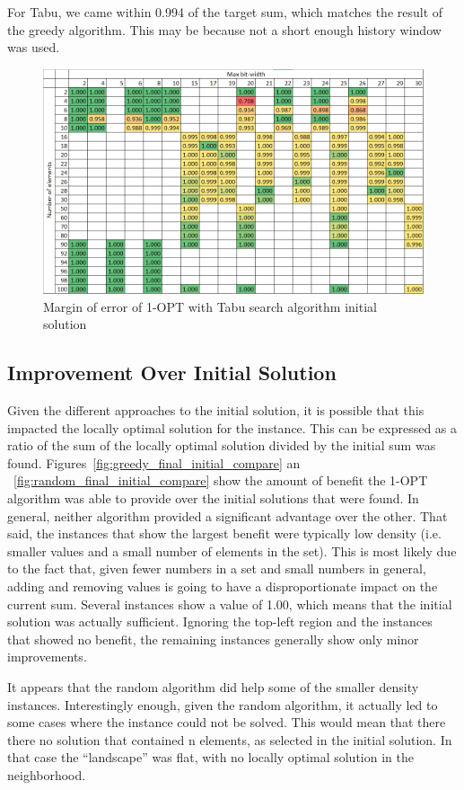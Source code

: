 \documentclass{report}
\begin{document}
For Tabu, we came within 0.994 of the target sum, which matches the result of the greedy algorithm. This
may be because not a short enough history window was used.

\begin{figure}[h]
  \centering
  \includegraphics[width=12cm]{p5_tabu_margin.png}
  \caption{Margin of error of 1-OPT with Tabu search algorithm initial solution}
  \label{fig:tabu_opt_margin}
\end{figure}

\subsection{Improvement Over Initial Solution}
Given the different approaches to the initial solution, it is possible that this impacted
the locally optimal solution for the instance. This can be expressed as a ratio of the sum of
the locally optimal solution divided by the initial sum was found. Figures~\ref{fig:greedy_final_initial_compare} an
~\ref{fig:random_final_initial_compare} show the amount of benefit the 1-OPT algorithm was able to
provide over the initial solutions that were found. In general, neither algorithm provided a significant advantage over
the other. That said, the instances that show the largest benefit were typically low density (i.e. smaller values
and a small number of elements in the set). This is most likely due to the fact that, given fewer numbers in a set and small
numbers in general, adding and removing values is going to have a disproportionate impact on the current sum. Several instances
show a value of 1.00, which means that the initial solution was actually sufficient. Ignoring the top-left region and the instances
that showed no benefit, the remaining instances generally show only minor improvements.

It appears that the random algorithm did help some of the smaller density instances. Interestingly enough, given
the random algorithm, it actually led to some cases where the instance could not be solved. This would mean
that there there no solution that contained n elements, as selected in the initial solution. In that case the ``landscape''
was flat, with no locally optimal solution in the neighborhood.
\end{document}
